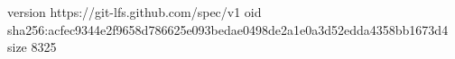 version https://git-lfs.github.com/spec/v1
oid sha256:acfec9344e2f9658d786625e093bedae0498de2a1e0a3d52edda4358bb1673d4
size 8325

